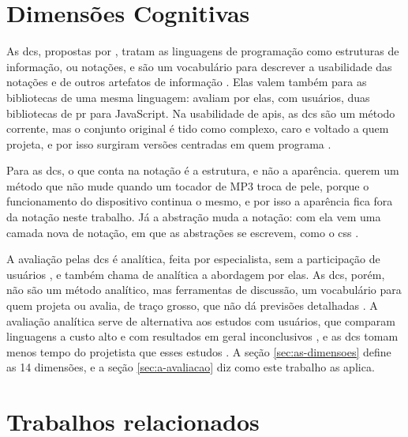 \section{Dimensões Cognitivas}
\label{sec:dimensoes-cognitivas}

As \glspl{dc}, propostas por \textcite[p. 443]{green1989}, tratam as
linguagens de programação como estruturas de informação, ou notações, e
são um vocabulário para descrever a
usabilidade das notações e de outros artefatos de informação
\cite[p. 327]{blackwell2001}.
Elas valem também para as bibliotecas de uma mesma linguagem:
\textcite[p. 1507]{zimmerle2025} avaliam por elas, com usuários, duas
bibliotecas de \gls{pr} para JavaScript.
Na usabilidade de \glspl{api}, as \glspl{dc} são um método corrente, mas o
conjunto original é tido como complexo, caro e voltado a quem projeta, e
por isso surgiram versões centradas em quem programa
\cite[p. 37-38]{lima2024}.

Para as \glspl{dc}, o que conta na notação é a estrutura, e não a
aparência.
\textcite[p. 333]{green2006} querem um método que não mude quando um
tocador de MP3 troca de pele, porque o funcionamento do dispositivo
continua o mesmo, e por isso a aparência fica fora da notação neste
trabalho.
Já a abstração muda a notação: com ela vem uma camada nova de notação,
em que as abstrações se escrevem, como o \gls{css}
\cite[p. 342]{green2006}.

A avaliação pelas \glspl{dc} é analítica, feita por especialista, sem a
participação de usuários \cite{blandford2008}, e
\textcite[p. 8]{kiss2014} também chama de analítica a abordagem por
elas.
As \glspl{dc}, porém, não são um método analítico, mas ferramentas de
discussão, um vocabulário para quem projeta ou avalia, de traço grosso,
que não dá previsões detalhadas \cite[p. 106]{blackwell2003}.
A avaliação analítica serve de alternativa aos estudos com usuários, que
comparam linguagens a custo alto e com resultados em geral
inconclusivos \cite[p. 9]{sadowski2011}, e as \glspl{dc} tomam
menos tempo do projetista que esses estudos \cite{dagit2006}.
A seção \ref{sec:as-dimensoes} define as 14 dimensões, e a seção
\ref{sec:a-avaliacao} diz como este trabalho as aplica.
\section{Trabalhos relacionados}
\label{sec:trabalhos-relacionados}

